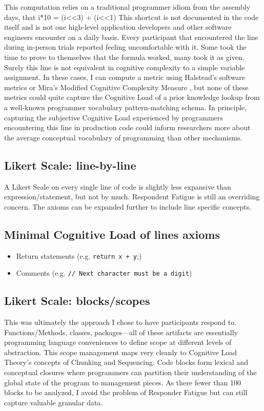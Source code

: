 This computation relies on a traditional programmer idiom from the assembly days, that
i*10 = (i\textless \textless 3) + (i\textless \textless1)
This shortcut is not documented in the code itself and is not one high-level application developers and other software engineers encounter on a daily basis. Every participant that encountered the line during in-person trials reported feeling uncomfortable with it. Some took the time to prove to themselves that the formula worked, many took it as given. Surely this line is not equivalent in cognitive complexity to a simple variable assignment. In these cases, I can compute a metric using Halstead’s software metrics or Mira’s Modified Cognitive Complexity Measure \cite{Choe2013}, but none of these metrics could quite capture the Cognitive Load of a prior knowledge lookup from a well-known programmer vocabulary pattern-matching schema. In principle, capturing the subjective Cognitive Load experienced by programmers encountering this line in production code could inform researchers more about the average conceptual vocabulary of programming than other mechanisms.

\subsection{Likert Scale: line-by-line}
 A Likert Scale on every single line of code is slightly less expansive than expression/statement, but not by much. Respondent Fatigue is still an overriding concern. The axioms can be expanded further to include line specific concepts.

\subsection{Minimal Cognitive Load of lines axioms}
\begin{itemize}
	\item Return statements (e.g. \texttt{return x + y};)
	\item Comments (e.g.  \texttt{// Next character must be a digit})
\end{itemize}
\subsection{Likert Scale: blocks/scopes}
This was ultimately the approach I chose to have participants respond to. Functions/Methods, classes, packages—all of these artifacts are essentially programming language conveniences to define scope at different levels of abstraction. This scope management maps very cleanly to Cognitive Load Theory’s concepts of Chunking and Sequencing. Code blocks form lexical and conceptual closures where programmers can partition their understanding of the global state of the program to management pieces. As there fewer than 100 blocks to be analyzed, I avoid the problem of Responder Fatigue but can still capture valuable granular data.

